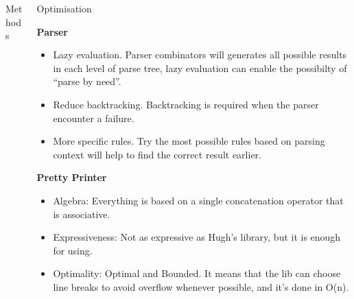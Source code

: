 \documentclass[final]{beamer}
\newlength{\onecolwid}
\newlength{\twocolwid}
\begin{document}
\begin{frame}[t]
\begin{columns}[t]
\begin{column}{\twocolwid}
\begin{columns}[t,totalwidth=\twocolwid]
\begin{column}{\onecolwid}
\begin{block}{Methods}
\end{block}


\end{column} %

\begin{column}{\onecolwid} %


\begin{block}{Optimisation}

\textbf{Parser}
\begin{itemize}
\item Lazy evaluation. Parser combinators will generates all possible results in each level
of parse tree, lazy evaluation can enable the possibilty of ``parse by need''.
\item Reduce backtracking. Backtracking is required when the parser encounter a failure.
\item More specific rules. Try the most possible rules based on parsing context will help to find the correct result earlier.
\end{itemize}

\textbf{Pretty Printer}
\begin{itemize}
\item Algebra: Everything is based on a single concatenation operator that is associative.
\item Expressiveness: Not as expressive as Hugh's library, but it is enough for using.
\item Optimality: Optimal and Bounded. It means that the lib can choose line breaks to avoid overflow whenever possible, and it's done in O(n).
\end{itemize}






\end{block}
\end{column}
\end{columns}
\end{column}
\end{columns}
\end{frame}
\end{document}
